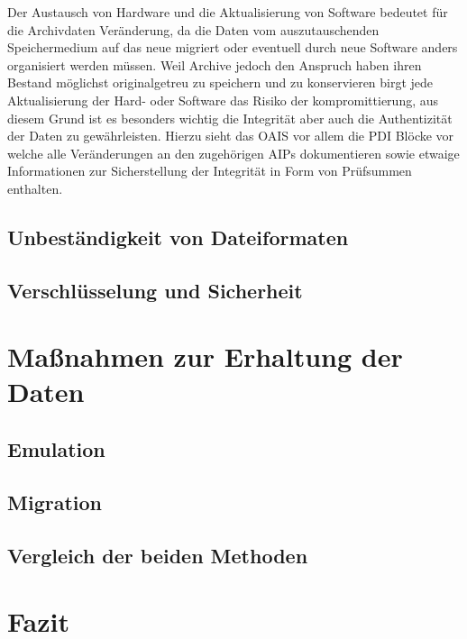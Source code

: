 \documentclass[conference,compsoc,final,a4paper]{IEEEtran}
\begin{document}
Der Austausch von Hardware und die Aktualisierung von Software bedeutet für die Archivdaten Veränderung, da die Daten vom auszutauschenden Speichermedium auf das neue migriert oder eventuell durch neue Software anders organisiert werden müssen. Weil Archive jedoch den Anspruch haben ihren Bestand möglichst originalgetreu zu speichern und zu konservieren birgt jede Aktualisierung der Hard- oder Software das Risiko der kompromittierung, aus diesem Grund ist es besonders wichtig die Integrität aber auch die Authentizität der Daten zu gewährleisten. Hierzu sieht das \ac{OAIS} vor allem die \ac{PDI} Blöcke vor welche alle Veränderungen an den zugehörigen \ac{AIP}s dokumentieren sowie etwaige Informationen zur Sicherstellung der Integrität in Form von Prüfsummen enthalten.

\subsection{Unbeständigkeit von Dateiformaten}


\subsection{Verschlüsselung und Sicherheit}


\section{Maßnahmen zur Erhaltung der Daten}


\subsection{Emulation}


\subsection{Migration}


\subsection{Vergleich der beiden Methoden}


\section{Fazit}
\end{document}
